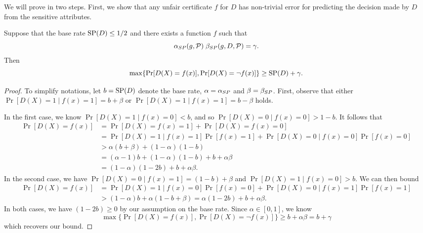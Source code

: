 We will prove  in two steps. First, we show that
any unfair certificate $f$ for $D$ has non-trivial error for
predicting the decision made by $D$ from the sensitive attributes.


\begin{lemma}\label{dis-acc}
  Suppose that the base rate $\mathrm{SP}(D) \leq 1/2$ and there exists a
  function $f$ such that
  $$\alpha_{SP}(g, \mathcal{P}) \; \beta_{SP}(g, D, \mathcal{P})= \gamma.$$  Then
  $$
  \max\{\Pr[D(X) = f(x)], \Pr[D(X) = \neg f(x)]\} \geq \mathrm{SP}(D) +
  \gamma.
  $$
\end{lemma}

\begin{proof}
  To simplify notations, let $b = \mathrm{SP}(D)$ denote the base rate,
  $\alpha = \alpha_{SP}$ and $\beta = \beta_{SP}$. First, observe that either
  $\Pr[D(X) = 1 \mid f(x) = 1] = b+ \beta$ or
  $\Pr[D(X) = 1\mid f(x) = 1] = b - \beta$ holds.

  In the first case, we know $\Pr[D(X) = 1\mid f(x) = 0] < b$, and
  so $\Pr[D(X) = 0 \mid f(x) = 0] > 1 - b$. It follows that
  \begin{align*}
    \Pr[D(X) = f(x) ] &= \Pr[D(X) = f(x) = 1] +\Pr[D(X) =
      f(x) = 0]\\
    &= \Pr[D(X) = 1 \mid f(x) = 1]\Pr[f(x) = 1] + \Pr[D(X) = 0 \mid f(x) = 0] \Pr[f(x)=0]\\
    &> \alpha (b + \beta) + (1-\alpha) (1 - b) \\ 
    &=  (\alpha - 1) b + (1 - \alpha) (1 - b) + b + \alpha\beta \\
    &= (1 - \alpha)(1 - 2b) + b + \alpha\beta.
  \end{align*}
  In the second case, we have
  $\Pr[D(X) = 0 \mid f(x) = 1] = (1 - b) + \beta$ and
  $\Pr[D(X) = 1\mid f(x) = 0] > b$. We can then bound
  \begin{align*}
   \Pr[D(X) = f(x) ] &= \Pr[D(X) = 1 \mid f(x) = 0]\Pr[f(x) = 0] + \Pr[D(X) = 0 \mid f(x) = 1] \Pr[f(x)=1]\\
    &> (1- \alpha) b  + \alpha (1 - b + \beta) =  \alpha(1 - 2b) +
      b+ \alpha\beta.
  \end{align*}
  In both cases, we have $(1 - 2b) \geq 0$ by our assumption on the
  base rate. Since $\alpha\in [0, 1]$, we know
  $$
  \max\{\Pr[D(X) = f(x)], \Pr[D(X) = \neg f(x)]\} \geq
  b + \alpha\beta = b+\gamma
  $$
  which recovers our bound.
\end{proof}






